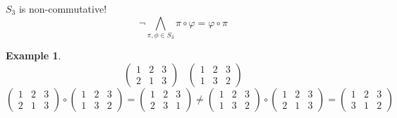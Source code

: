 \documentclass[a4paper,landscape,twocolumn]{article}
\newtheorem{ex}{Example}
\begin{document}
$S_3$ is non-commutative!
\[ \neg \bigwedge_{\pi, \phi \in S_3} \pi \circ \varphi = \varphi \circ \pi \]

\begin{ex}
  \[
    \begin{pmatrix} 1 & 2 & 3 \\ 2 & 1 & 3 \end{pmatrix}
    \hspace{10pt}
    \begin{pmatrix} 1 & 2 & 3 \\ 1 & 3 & 2 \end{pmatrix}
  \]
  \[
    \begin{pmatrix} 1 & 2 & 3 \\ 2 & 1 & 3 \end{pmatrix}
      \circ \begin{pmatrix} 1 & 2 & 3 \\ 1 & 3 & 2 \end{pmatrix}
      = \begin{pmatrix} 1 & 2 & 3 \\ 2 & 3 & 1 \end{pmatrix}
      \neq \begin{pmatrix} 1 & 2 & 3 \\ 1 & 3 & 2 \end{pmatrix}
      \circ \begin{pmatrix} 1 & 2 & 3 \\ 2 & 1 & 3 \end{pmatrix}
      = \begin{pmatrix} 1 & 2 & 3 \\ 3 & 1 & 2 \end{pmatrix}
  \]
\end{ex}
\end{document}
